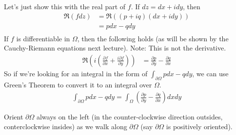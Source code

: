 \begin{corollary}
    Let's just show this with the real part of $f$. If $dz = dx + idy$, then
    \begin{align*}
        \Re(fdz) & = \Re((p + iq)(dx + idy)) \\
                 & = pdx - qdy               \\
    \end{align*}
    If $f$ is differentiable in $\Omega$, then the following holds (as will be shown by the Cauchy-Riemann equations next lecture). Note: This is not the derivative.
    \begin{align*}
        \Re{(i \left(\frac{\partial f}{\partial x} + \frac{i \partial f}{\partial y}\right))} & = \frac{\partial p}{\partial y} - \frac{\partial q}{\partial x}
    \end{align*}
    So if we're looking for an integral in the form of $\int_{\partial \Omega} pdx - qdy$, we can use Green's Theorem to convert it to an integral over $\Omega$.
    \begin{align*}
        \int_{\partial \Omega} pdx - qdy =
        \int_{\Omega} \left( \frac{\partial p}{\partial y} - \frac{\partial q}{\partial x} \right) dxdy
    \end{align*}
\end{corollary}

\begin{remark}
    Orient $\partial \Omega$ always on the left (in the counter-clockwise direction outsides, conterclockwise insides) as we walk along $\partial \Omega$ (say $\partial \Omega$ is positively oriented).
\end{remark}

